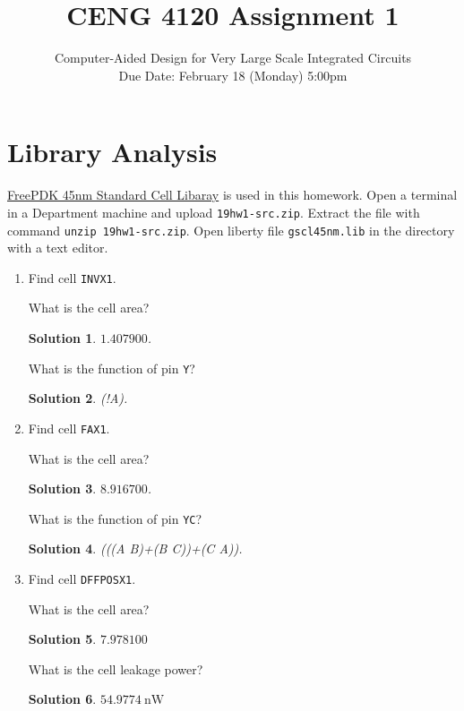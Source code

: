 \documentclass[acmlarge,screen=true,anonymous=false,11pt]{acmart}
\newtheorem*{solution*}{Solution}
\begin{document}
\title{CENG 4120 Assignment 1}
\subtitle{Computer-Aided Design for Very Large Scale Integrated Circuits \\ Due Date: February 18 (Monday) 5:00pm}

\maketitle

\section{Library Analysis}
\href{https://www.eda.ncsu.edu/wiki/FreePDK45:Contents}{FreePDK 45nm Standard Cell Libaray} is used in this homework.
Open a terminal in a Department machine and upload \texttt{19hw1-src.zip}.
Extract the file with command \texttt{unzip 19hw1-src.zip}.
Open liberty file \texttt{gscl45nm.lib} in the directory with a text editor.
\begin{enumerate}
    \item Find cell \texttt{INVX1}.
    \begin{example}
        What is the cell area?
    \end{example}
    \begin{solution*}
        $1.407900$.
    \end{solution*}
    \begin{example}
        What is the function of pin \texttt{Y}?
    \end{example}
    \begin{solution*}
        (!A).
    \end{solution*}
    \item Find cell \texttt{FAX1}.
    \begin{example}
        What is the cell area?
    \end{example}
    \begin{solution*}
        $8.916700$.
    \end{solution*}
    \begin{example}
        What is the function of pin \texttt{YC}?
    \end{example}
    \begin{solution*}
        (((A B)+(B C))+(C A)).
    \end{solution*}
    \item Find cell \texttt{DFFPOSX1}.
    \begin{example}
        What is the cell area?
    \end{example}
    \begin{solution*}
        $7.978100$
    \end{solution*}
    \begin{example}
        What is the cell leakage power?
    \end{example}
    \begin{solution*}
        $54.9774~\mathrm{nW}$
    \end{solution*}
\end{enumerate}
\end{document}
